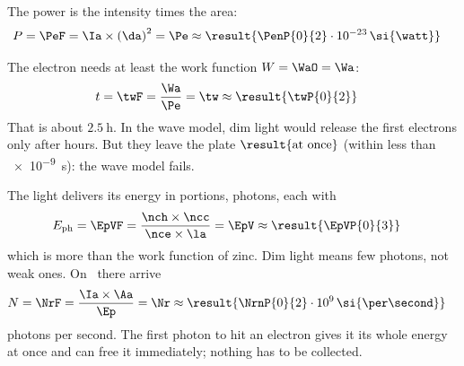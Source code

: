 \begin{abcliste}
\abc The power is the intensity times the area:
\begin{align}
 P &= \PeF = \Ia\times\left(\da\right)^2 = \Pe \approx \result{\PenP{0}{2}\cdot 10^{-23}\,\si{\watt}}
\end{align}

\abc The electron needs at least the work function $W = \WaO = \Wa$:
\begin{align}
 t &= \twF = \frac{\Wa}{\Pe} = \tw \approx \result{\twP{0}{2}}
\end{align}
That is about $\SI{2.5}{\hour}$. In the wave model, dim light would release the first electrons only after hours. But they leave the plate $\result{\text{at once}}$ (within less than \SI{e-9}{\s}): the wave model fails.

\abc The light delivers its energy in portions, photons, each with
\begin{align}
 E_\mathrm{ph} &= \EpVF = \frac{\nch\times\ncc}{\nce\times\la} = \EpV \approx \result{\EpVP{0}{3}}
\end{align}
which is more than the work function of zinc. Dim light means few photons, not weak ones. On \AaO\ there arrive
\begin{align}
 N &= \NrF = \frac{\Ia\times\Aa}{\Ep} = \Nr \approx \result{\NrnP{0}{2}\cdot 10^{9}\,\si{\per\second}}
\end{align}
photons per second. The first photon to hit an electron gives it its whole energy at once and can free it immediately; nothing has to be collected.
\end{abcliste}
